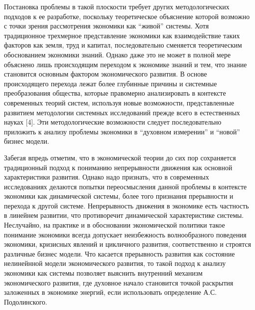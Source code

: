 Постановка проблемы в такой плоскости требует других методологических
подходов к ее разработке, поскольку теоретическое объяснение которой
возможно с точки зрения рассмотрения экономики как ``живой'' системы.
Хотя традиционное трехмерное представление экономики как взаимодействие
таких факторов как земля, труд и капитал, последовательно сменяется
теоретическим обоснованием экономики знаний. Однако даже это не может в
полной мере объяснено лишь происходящим переходом к экономике знаний и
тем, что знание становится основным фактором экономического развития. В
основе происходящего перехода лежат более глубинные причины и системные
преобразования общества, которые правомерно анализировать в контексте
современных теорий систем, используя новые возможности, представленные
развитием методологии системных исследований прежде всего в естественных
науках {[}4{]}. Эти методологические возможности следует последовательно
приложить к анализу проблемы экономики в ``духовном измерении'' и
``новой'' бизнес модели.

Забегая впредь отметим, что в экономической теории до сих пор
сохраняется традиционный подход к пониманию непрерывности движения как
основной характеристики развития. Однако надо признать, что в
современных исследованиях делаются попытки переосмысления данной
проблемы в контексте экономики как динамической системы, более того
признания прерывности и перехода к другой системе. Непрерывность
движения в экономике есть частность в линейнем развитии, что
противоречит динамической характеристике системы. Неслучайно, на
практике и в обосновании экономической политики такое понимание
экономики всегда допускает неизбежность волнообразного поведения
экономики, кризисных явлений и цикличного развития, соответственно и
строятся различные бизнес модели. Что касается прерывность развития как
состояние нелинейнной модели экономического развития, то такой подход к
анализу экономики как системы позволяет выяснить внутренний механизм
экономического развития, где духовное начало становится точкой раскрытия
заложенных в экономике энергий, если использовать определение А.С.
Подолинского.

